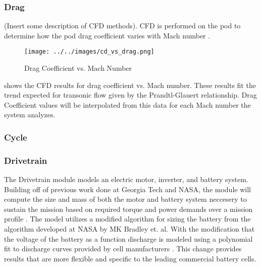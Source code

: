 \subsubsection{Drag}
	(Insert some description of CFD methods).
	CFD is performed on the pod to determine how the pod drag coefficient varies with Mach number .
	\begin{figure}
		\centering
		\texttt{[image: ../../images/cd\_vs\_drag.png]}
		\caption{Drag Coefficient vs. Mach Number}
		\label{fig:cd_vs_mach}
	\end{figure}
	 shows the CFD results for drag coefficient vs. Mach number. These results fit the trend expected for transonic flow given by the Prandtl-Glauert relationship. Drag Coefficient values will be interpolated from this data for each Mach number the system analyzes.
\subsubsection{Cycle}
\subsubsection{Drivetrain}
	The Drivetrain module  models an electric motor, inverter, and battery system. Building off of previous work done at Georgia Tech and NASA, the module will compute the size and mass of both the motor and battery system neccesery to sustain the mission based on required torque and power demands over a mission profile \cite{GeorgiaTechMotor, NASASugar}. The model utilizes a modified algorithm for sizing the battery from the algorithm developed at NASA by MK Bradley et. al. With the modification that the voltage of the battery as a function discharge is modeled using a polynomial fit to discharge curves provided by cell manufacturers \cite{NASASugar}. This change provides results that are more flexible and specific to the leading commercial battery cells.
